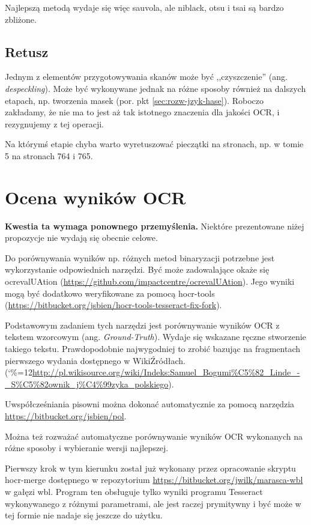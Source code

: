 \documentclass[12]{mwart}
\newcommand{\program}[1]{\textsf{#1}}
\begin{document}
Najlepszą metodą wydaje się więc sauvola, ale niblack, otsu i tsai są
bardzo zbliżone.

\subsection{Retusz}
\label{sec:retusz}

Jednym z elementów przygotowywania skanów może być ,,czyszczenie''
(ang. \textit{despeckling}). Może być wykonywane jednak na różne
sposoby również na dalszych etapach, np. tworzenia masek (por. pkt
\ref{sec:rozw-jzyk-hase}). Roboczo zakładamy, że nie ma to jest aż tak
istotnego znaczenia dla jakości OCR, i rezygnujemy z tej operacji.


Na którymś etapie chyba warto wyretuszować pieczątki na stronach,
np. w tomie 5 na stronach 764 i 765.

\section{Ocena wyników OCR}
\label{sec:ocena-wynikow-ocr}

\textbf{Kwestia ta wymaga ponownego przemyślenia.} Niektóre
prezentowane niżej propozycje nie wydają się obecnie celowe.

Do porównywania wyników np. różnych metod binaryzacji potrzebne jest
wykorzystanie odpowiednich narzędzi. Być może zadowalające okaże się
\program{ocrevalUAtion}
(\url{https://github.com/impactcentre/ocrevalUAtion}). Jego wyniki
mogą być dodatkowo weryfikowane za pomocą \program{hocr-tools}
(\url{https://bitbucket.org/jsbien/hocr-tools-tesseract-fix-fork}).

Podstawowym zadaniem tych narzędzi jest porównywanie wyników OCR z
tekstem wzorcowym (ang. \textit{Ground-Truth}). Wydaje się wskazane
ręczne stworzenie takiego tekstu. Prawdopodobnie najwygodniej to
zrobić bazując na fragmentach pierwszego wydania dostępnego w
WikiŹródłach.
({\catcode`\%=12\url{http://pl.wikisource.org/wiki/Indeks:Samuel_Bogumi%C5%82_Linde_-_S%C5%82ownik_j%C4%99zyka_polskiego}}).

Uwspółcześniania pisowni można dokonać automatycznie za pomocą
narzędzia \url{https://bitbucket.org/jsbien/pol}.

Można też rozważać automatyczne porównywanie wyników OCR wykonanych na
różne sposoby i wybieranie wersji najlepszej. 

Pierwszy krok w tym kierunku został już wykonany przez opracowanie
skryptu \program{hocr-merge} dostępnego w repozytorium
\hbox{\url{https://bitbucket.org/jwilk/marasca-wbl}} w gałęzi
\textsf{wbl}. Program ten obsługuje tylko wyniki programu
\program{Tesseract} wykonywanego z różnymi parametrami, ale jest
raczej prymitywny i być może w tej formie nie nadaje się jeszcze do
użytku.
\end{document}
